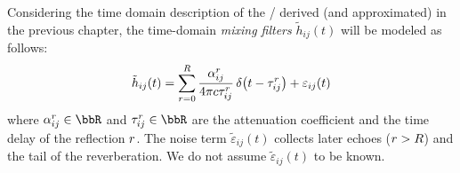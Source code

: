 Considering the time domain description of the \RIR/ derived (and approximated) in the previous chapter,
the time-domain \emph{mixing filters} $\tilde{h}_{ij}( t)$ will be modeled as follows:
\begin{equation}\label{eq:processing:mixing_filter}
    \tilde{h}_{ij}( t) = \sum_{\idxEch=0}^{\numEchs} \frac{\absCoeff_{ij}^r}{4 \pi \speedOfSound \tau_{ij}^r}
                          \diracOf{t - \tau_{ij}^r} + \varepsilon_{ij}(t)
\end{equation}
where $\absCoeff_{ij}^r \in \R$ and $\tau_{ij}^r \in \R$ are the attenuation coefficient and the time delay of the reflection $r$.
The noise term $\tilde{\varepsilon}_{ij}( t)$ collects later echoes ($r > R$) and the tail of the reverberation.
We do not assume $\tilde{\varepsilon}_{ij}( t)$ to be known.

